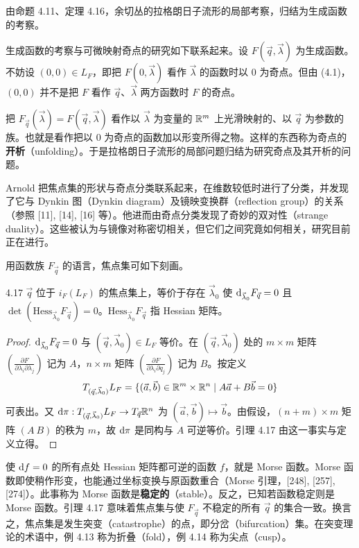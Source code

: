 由命题 4.11、定理 4.16，余切丛的拉格朗日子流形的局部考察，归结为生成函数的考察。

生成函数的考察与可微映射奇点的研究如下联系起来。设 $F(\vec q,\vec\lambda)$ 为生成函数。不妨设 $(0,0)\in L_F$，即把 $F(0,\vec\lambda)$ 看作 $\vec\lambda$ 的函数时以 $0$ 为奇点。但由 (4.1)，$(0,0)$ 并不是把 $F$ 看作 $\vec q$、$\vec\lambda$ 两方函数时 $F$ 的奇点。

把 $F_{\vec q}(\vec\lambda)=F(\vec q,\vec\lambda)$ 看作以 $\vec\lambda$ 为变量的 $\mathbb{R}^m$ 上光滑映射的、以 $\vec q$ 为参数的族。也就是看作把以 $0$ 为奇点的函数加以形变所得之物。这样的东西称为奇点的\textbf{开析}（unfolding）。于是拉格朗日子流形的局部问题归结为研究奇点及其开析的问题。

Arnold 把焦点集的形状与奇点分类联系起来，在维数较低时进行了分类，并发现了它与 Dynkin 图（Dynkin diagram）及镜映变换群（reflection group）的关系（参照 [11], [14], [16] 等）。他进而由奇点分类发现了奇妙的双对性（strange duality）。这些被认为与镜像对称密切相关，但它们之间究竟如何相关，研究目前正在进行。

用函数族 $F_{\vec q}$ 的语言，焦点集可如下刻画。

\begin{lemma*}{4.17}
  $\vec q$ 位于 $i_F(L_F)$ 的焦点集上，等价于存在 $\vec\lambda_0$ 使 $\mathrm{d}_{\vec\lambda_0}F_{\vec q}=0$ 且 $\det(\mathrm{Hess}_{\vec\lambda_0}F_{\vec q})=0$。$\mathrm{Hess}_{\vec\lambda_0}F_{\vec q}$ 指 Hessian 矩阵。
\end{lemma*}
\begin{proof}
  $\mathrm{d}_{\vec\lambda_0}F_{\vec q}=0$ 与 $(\vec q,\vec\lambda_0)\in L_F$ 等价。在 $(\vec q,\vec\lambda_0)$ 处的 $m\times m$ 矩阵 $\left(\frac{\partial F}{\partial\lambda_i\partial\lambda_j}\right)$ 记为 $A$，$n\times m$ 矩阵 $\left(\frac{\partial F}{\partial\lambda_i\partial q_j}\right)$ 记为 $B$。按定义
  \[
    T_{(\vec q,\vec\lambda_0)}L_F=\{(\vec a,\vec b)\in\mathbb{R}^m\times\mathbb{R}^n\mid A\vec a+B\vec b=0\}
  \]
  可表出。又 $\mathrm{d}\pi:T_{(\vec q,\vec\lambda_0)}L_F\to T_{\vec q}\mathbb{R}^n$ 为 $(\vec a,\vec b)\mapsto\vec b$。由假设，$(n+m)\times m$ 矩阵 $(A\ B)$ 的秩为 $m$，故 $\mathrm{d}\pi$ 是同构与 $A$ 可逆等价。引理 4.17 由这一事实与定义立得。
\end{proof}

使 $\mathrm{d} f=0$ 的所有点处 Hessian 矩阵都可逆的函数 $f$，就是 Morse 函数。Morse 函数即使稍作形变，也能通过坐标变换与原函数重合（Morse 引理，[248], [257], [274]）。此事称为 Morse 函数是\textbf{稳定的}（stable）。反之，已知若函数稳定则是 Morse 函数。引理 4.17 意味着焦点集与使 $F_{\vec q}$ 不稳定的所有 $\vec q$ 的集合一致。换言之，焦点集是发生突变（catastrophe）的点，即分岔（bifurcation）集。在突变理论的术语中，例 4.13 称为折叠（fold），例 4.14 称为尖点（cusp）。

